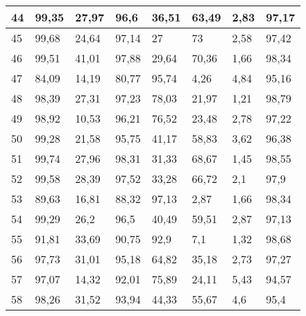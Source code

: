 \begin{longtable}[c]{|l|l|l|l|l|l|l|l|}
44              & 99,35        & 27,97        & 96,6        & 36,51         & 63,49         & 2,83          & 97,17         \\ \hline
45              & 99,68        & 24,64        & 97,14       & 27            & 73            & 2,58          & 97,42         \\ \hline
46              & 99,51        & 41,01        & 97,88       & 29,64         & 70,36         & 1,66          & 98,34         \\ \hline
47              & 84,09        & 14,19        & 80,77       & 95,74         & 4,26          & 4,84          & 95,16         \\ \hline
48              & 98,39        & 27,31        & 97,23       & 78,03         & 21,97         & 1,21          & 98,79         \\ \hline
49              & 98,92        & 10,53        & 96,21       & 76,52         & 23,48         & 2,78          & 97,22         \\ \hline
50              & 99,28        & 21,58        & 95,75       & 41,17         & 58,83         & 3,62          & 96,38         \\ \hline
51              & 99,74        & 27,96        & 98,31       & 31,33         & 68,67         & 1,45          & 98,55         \\ \hline
52              & 99,58        & 28,39        & 97,52       & 33,28         & 66,72         & 2,1           & 97,9          \\ \hline
53              & 89,63        & 16,81        & 88,32       & 97,13         & 2,87          & 1,66          & 98,34         \\ \hline
54              & 99,29        & 26,2         & 96,5        & 40,49         & 59,51         & 2,87          & 97,13         \\ \hline
55              & 91,81        & 33,69        & 90,75       & 92,9          & 7,1           & 1,32          & 98,68         \\ \hline
56              & 97,73        & 31,01        & 95,18       & 64,82         & 35,18         & 2,73          & 97,27         \\ \hline
57              & 97,07        & 14,32        & 92,01       & 75,89         & 24,11         & 5,43          & 94,57         \\ \hline
58              & 98,26        & 31,52        & 93,94       & 44,33         & 55,67         & 4,6           & 95,4          \\ \hline

\end{longtable}
